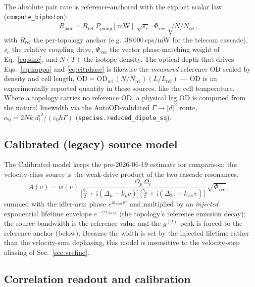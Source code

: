 \documentclass[11pt]{article}
\newcommand{\ii}{\mathrm{i}}
\newcommand{\code}[1]{\texttt{#1}}
\begin{document}
The absolute pair rate is reference-anchored with the explicit scalar law
(\code{compute\_biphoton}):
\begin{equation}
R_{\text{pair}}
=R_{\text{ref}}\;P_{\text{pump}}[\mathrm{mW}]\;
\sqrt{s_c}\;\;\Phi_{\text{vec}}\;
\sqrt{N/N_{\text{ref}}},
\label{eq:pairrate}
\end{equation}
with $R_{\text{ref}}$ the per-topology anchor (e.g.\ $38\,000$\,cps/mW for the
telecom cascade), $s_c$ the relative coupling drive, $\Phi_{\text{vec}}$ the
vector phase-matching weight of Eq.~\eqref{eq:sinc}, and $N(T)$ the isotope
density. The optical depth that drives Eqs.~\eqref{eq:kappa} and
\eqref{eq:eitphase} is likewise the \emph{measured} reference OD scaled by
density and cell length, $\mathrm{OD}=\mathrm{OD}_{\text{ref}}\,
(N/N_{\text{ref}})(L/L_{\text{ref}})$ --- OD is an experimentally reported
quantity in these sources, like the cell temperature. Where a topology carries
no reference OD, a physical leg OD is computed from the natural linewidth via
the AutoOD-validated $\Gamma\to|d|^2$ route,
$\alpha_0=2Nk|d|^2/(\varepsilon_0\hbar\Gamma)$
(\code{species.reduced\_dipole\_sq}).

\subsection{Calibrated (legacy) source model}

The Calibrated model keeps the pre-2026-06-19 estimate for comparison: the
velocity-class source is the weak-drive product of the two cascade resonances,
\begin{equation}
A(v)=w(v)\,\frac{\Omega_{p}\,\Omega_{c}}
{\big[\tfrac{\gamma_\ell}{2}+\ii(\Delta_{p}-k_{p}v)\big]\,
 \big[\tfrac{\gamma_u}{2}+\ii(\Delta_{2\gamma}-k_{\text{res}}v)\big]}\,
 \sqrt{\Phi_{\text{vec}}},
\label{eq:sourcev}
\end{equation}
summed with the idler-arm phase $e^{\ii k_{\text{idler}}v\tau}$ and multiplied
by an \emph{injected} exponential lifetime envelope
$e^{-\tau/\tau_{\text{decay}}}$ (the topology's reference emission decay); the
source bandwidth is the reference value and the $g^{(2)}$ peak is forced to the
reference anchor (below). Because the width is set by the injected lifetime
rather than the velocity-sum dephasing, this model is insensitive to the
velocity-step aliasing of Sec.~\ref{sec:vrefine}.

\subsection{Correlation readout and calibration}
\end{document}
